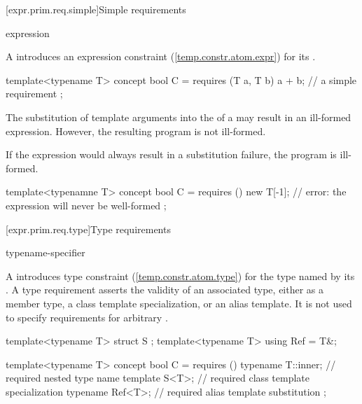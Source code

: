 [expr.prim.req.simple]{Simple requirements}

\begin{bnf}
\br
  expression
\end{bnf}

\pnum
A  introduces 
an expression constraint (\ref{temp.constr.atom.expr}) 
for its .
% 
\enterexample
\begin{codeblock}
template<typename T> concept bool C =
  requires (T a, T b) {
    a + b;  // a simple requirement
  };
\end{codeblock}
\exitexample

\pnum
The substitution of template arguments into the
 of a 
 may result
in an ill-formed expression. However, the resulting program is not 
ill-formed. 

\pnum
If the expression would always result in a substitution failure, 
the program is ill-formed.
\enterexample
\begin{codeblock}
template<typenamne T> concept bool C =
requires () {
new T[-1];  // error: the expression will never be well-formed
};
\end{codeblock}
\exitexample


[expr.prim.req.type]{Type requirements}

\begin{bnf}
\br
  typename-specifier
\end{bnf}

\pnum
A  introduces 
type constraint (\ref{temp.constr.atom.type}) for 
the type named by its 
.
% 
\enternote
A type requirement asserts the validity of an associated
type, either as a member type, a class template specialization,
or an alias template. It is not used to specify requirements for
arbitrary .
\exitnote
% 
\enterexample
\begin{codeblock}
template<typename T> struct S { };
template<typename T> using Ref = T&;

template<typename T> concept bool C =
  requires () {
    typename T::inner; // required nested type name
    template S<T>;   // required class template specialization
    typename Ref<T>; // required alias template substitution
  };
\end{codeblock}
\exitexample


